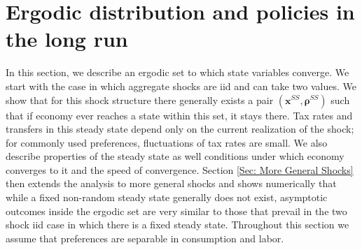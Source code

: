 \documentclass[thmsb,11pt]{article}
\begin{document}
\section{Ergodic distribution and policies in the long run } \label{sec: SteadyStates}
In this section, we describe  an  ergodic set to which state variables converge. We start with the case in which aggregate shocks are iid and can take two values. We show that for this shock structure there generally exists a  pair $\left( \bm{x}^{SS},\bm{\rho} ^{SS}\right) $  such that if economy ever reaches a state within this set, it stays there.  Tax rates and transfers in this steady state depend only on the current realization of the shock;  for commonly used preferences, fluctuations of tax rates are small. We also describe properties of the steady state as well conditions under which economy converges to it and the speed of convergence.   Section \ref{Sec: More General Shocks}  then extends the analysis to more general shocks and shows numerically that while a fixed non-random steady state generally does not exist, asymptotic outcomes inside the  ergodic set are very similar to those
that prevail in the two shock iid case in which there is a fixed steady state. Throughout this section we assume that preferences are separable in consumption and
labor.
%
%
\end{document}
